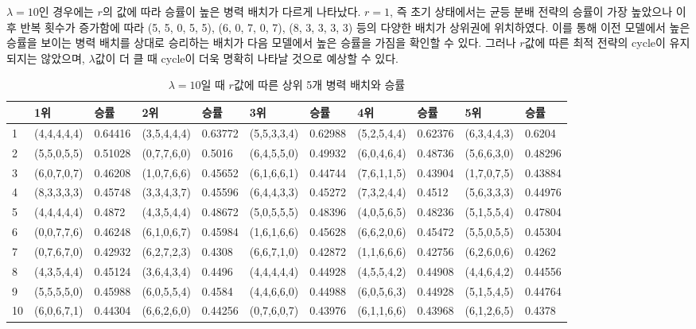 $\lambda=10$인 경우에는 $r$의 값에 따라 승률이 높은 병력 배치가 다르게 나타났다. $r=1$, 즉 초기 상태에서는 균등 분배 전략의 승률이 가장 높았으나 이후 반복 횟수가 증가함에 따라 (5, 5, 0, 5, 5), (6, 0, 7, 0, 7), (8, 3, 3, 3, 3) 등의 다양한 배치가 상위권에 위치하였다. 이를 통해 이전 모델에서 높은 승률을 보이는 병력 배치를 상대로 승리하는 배치가 다음 모델에서 높은 승률을 가짐을 확인할 수 있다. 그러나 $r$값에 따른 최적 전략의 cycle이 유지되지는 않았으며, $\lambda$값이 더 클 때 cycle이 더욱 명확히 나타날 것으로 예상할 수 있다.\\

\begin{table}[htb!]
    \centering
    \caption{$\lambda = 10$일 때 $r$값에 따른 상위 5개 병력 배치와 승률}
    {\scriptsize
    \begin{tabular}{l|ll|ll|ll|ll|ll}
       & 1위       & 승률      & 2위       & 승률      & 3위       & 승률      & 4위       & 승률      & 5위       & 승률      \\ \hline
    1  & (4,4,4,4,4) & 0.64416 & (3,5,4,4,4) & 0.63772 & (5,5,3,3,4) & 0.62988 & (5,2,5,4,4) & 0.62376 & (6,3,4,4,3) & 0.6204  \\
    2  & (5,5,0,5,5) & 0.51028 & (0,7,7,6,0) & 0.5016  & (6,4,5,5,0) & 0.49932 & (6,0,4,6,4) & 0.48736 & (5,6,6,3,0) & 0.48296 \\
    3  & (6,0,7,0,7) & 0.46208 & (1,0,7,6,6) & 0.45652 & (6,1,6,6,1) & 0.44744 & (7,6,1,1,5) & 0.43904 & (1,7,0,7,5) & 0.43884 \\
    4  & (8,3,3,3,3) & 0.45748 & (3,3,4,3,7) & 0.45596 & (6,4,4,3,3) & 0.45272 & (7,3,2,4,4) & 0.4512  & (5,6,3,3,3) & 0.44976 \\
    5  & (4,4,4,4,4) & 0.4872  & (4,3,5,4,4) & 0.48672 & (5,0,5,5,5) & 0.48396 & (4,0,5,6,5) & 0.48236 & (5,1,5,5,4) & 0.47804 \\
    6  & (0,0,7,7,6) & 0.46248 & (6,1,0,6,7) & 0.45984 & (1,6,1,6,6) & 0.45628 & (6,6,2,0,6) & 0.45472 & (5,5,0,5,5) & 0.45304 \\
    7  & (0,7,6,7,0) & 0.42932 & (6,2,7,2,3) & 0.4308  & (6,6,7,1,0) & 0.42872 & (1,1,6,6,6) & 0.42756 & (6,2,6,0,6) & 0.4262  \\
    8  & (4,3,5,4,4) & 0.45124 & (3,6,4,3,4) & 0.4496  & (4,4,4,4,4) & 0.44928 & (4,5,5,4,2) & 0.44908 & (4,4,6,4,2) & 0.44556 \\
    9  & (5,5,5,5,0) & 0.45988 & (6,0,5,5,4) & 0.4584  & (4,4,6,6,0) & 0.44988 & (6,0,5,6,3) & 0.44928 & (5,1,5,4,5) & 0.44764 \\
    10 & (6,0,6,7,1) & 0.44304 & (6,6,2,6,0) & 0.44256 & (0,7,6,0,7) & 0.43976 & (6,1,1,6,6) & 0.43968 & (6,1,2,6,5) & 0.4378 
    \end{tabular}}
    \label{tab:my_label}
\end{table}

